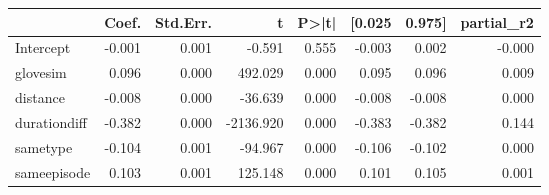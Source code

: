 \begin{tabular}{lrrrrrrr}
\toprule
{} &  Coef. &  Std.Err. &         t &  P>|t| &  [0.025 &  0.975] &  partial\_r2 \\
\midrule
Intercept    & -0.001 &     0.001 &    -0.591 &  0.555 &  -0.003 &   0.002 &      -0.000 \\
glovesim     &  0.096 &     0.000 &   492.029 &  0.000 &   0.095 &   0.096 &       0.009 \\
distance     & -0.008 &     0.000 &   -36.639 &  0.000 &  -0.008 &  -0.008 &       0.000 \\
durationdiff & -0.382 &     0.000 & -2136.920 &  0.000 &  -0.383 &  -0.382 &       0.144 \\
sametype     & -0.104 &     0.001 &   -94.967 &  0.000 &  -0.106 &  -0.102 &       0.000 \\
sameepisode  &  0.103 &     0.001 &   125.148 &  0.000 &   0.101 &   0.105 &       0.001 \\
\bottomrule
\end{tabular}

